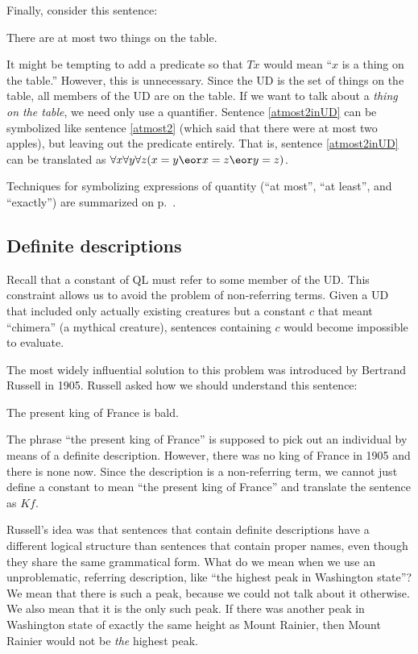Finally, consider this sentence:
\begin{kormanize}
\item[\ex{atmost2inUD}] There are at most two things on the table.
\end{kormanize}
It might be tempting to add a predicate so that $Tx$ would mean ``$x$ is a thing on the table.'' However, this is unnecessary. Since the UD is the set of things on the table, all members of the UD are on the table. If we want to talk about a \emph{thing on the table}, we need only use a quantifier. Sentence \ref{atmost2inUD} can be symbolized like sentence \ref{atmost2} (which said that there were at most two apples), but leaving out the predicate entirely. That is, sentence \ref{atmost2inUD} can be translated as $\forall x \forall y \forall z(x=y \eor x=z \eor y=z)$.

Techniques for symbolizing expressions of quantity (``at most'', ``at least'', and ``exactly'') are summarized on p.~\pageref{summary.atleast}.


\subsection{Definite descriptions}

\label{subsec.defdesc}
Recall that a constant of QL must refer to some member of the UD. This constraint allows us to avoid the problem of non-referring terms. Given a UD that included only actually existing creatures but a constant $c$ that meant ``chimera'' (a mythical creature), sentences containing $c$ would become impossible to evaluate.

The most widely influential solution to this problem was introduced by Bertrand Russell in 1905. Russell asked how we should understand this sentence:
\begin{kormanize}
\item[\ex{defdesc1}] The present king of France is bald.
\end{kormanize}
The phrase ``the present king of France'' is supposed to pick out an individual by means of a definite description. However, there was no king of France in 1905 and there is none now. Since the description is a non-referring term, we cannot just define a constant to mean ``the present king of France'' and translate the sentence as $Kf$.

Russell's idea was that sentences that contain definite descriptions have a different logical structure than sentences that contain proper names, even though they share the same grammatical form. What do we mean when we use an unproblematic, referring description, like ``the highest peak in Washington state''? We mean that there is such a peak, because we could not talk about it otherwise. We also mean that it is the only such peak. If there was another peak in Washington state of exactly the same height as Mount Rainier, then Mount Rainier would not be \emph{the} highest peak.

